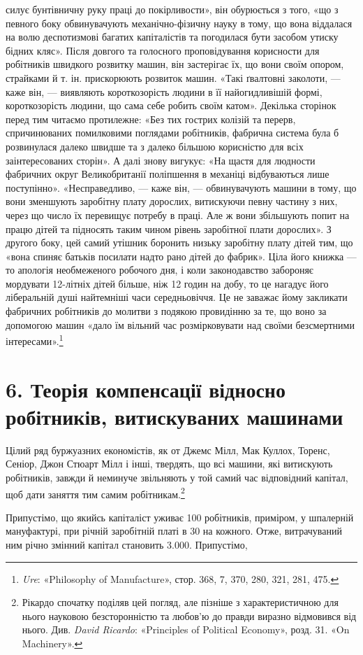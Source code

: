 \parcont{}  %
силує бунтівничну руку праці до покірливости», він обурюється
з того, «що з певного боку обвинувачують механічно-фізичну
науку в тому, що вона віддалася на волю деспотизмові багатих
капіталістів та погодилася бути засобом утиску бідних кляс».
Після довгого та голосного проповідування корисности для робітників
швидкого розвитку машин, він застерігає їх, що вони своїм
опором, страйками й т. ін. прискорюють розвиток машин. «Такі
ґвалтовні заколоти, — каже він, — виявляють короткозорість людини
в її найогидливішій формі, короткозорість людини, що сама
себе робить своїм катом». Декілька сторінок перед тим читаємо
протилежне: «Без тих гострих колізій та перерв, спричинюваних
помилковими поглядами робітників, фабрична система була б
розвинулася далеко швидше та з далеко більшою корисністю
для всіх заінтересованих сторін». А далі знову вигукує: «На
щастя для людности фабричних округ Великобританії поліпшення
в механіці відбуваються лише поступінно». «Несправедливо, —
каже він, — обвинувачують машини в тому, що вони зменшують
заробітну плату дорослих, витискуючи певну частину з них, через
що число їх перевищує потребу в праці. Але ж вони збільшують
попит на працю дітей та підносять таким чином рівень заробітної
плати дорослих». З другого боку, цей самий утішник боронить
низьку заробітну плату дітей тим, що «вона спиняє батьків посилати
надто рано дітей до фабрик». Ціла його книжка — то апологія
необмеженого робочого дня, і коли законодавство забороняє
мордувати 12-літніх дітей більше, ніж 12 годин на добу, то це
нагадує його ліберальній душі найтемніші часи середньовіччя.
Це не заважає йому закликати фабричних робітників до молитви
з подякою провидінню за те, що воно за допомогою машин
«дало їм вільний час розмірковувати над своїми безсмертними
інтересами».\footnote{
\emph{Ure}: «Philosophy of Manufacture», стор. 368, 7, 370, 280, 321, 281, 475.
}

\section*{6. Теорія компенсації відносно робітників, витискуваних
машинами}

Цілий ряд буржуазних економістів, як от Джемс Мілл, Мак
Куллох, Торенс, Сеніор, Джон Стюарт Мілл і інші, твердять,
що всі машини, які витискують робітників, завжди й неминуче
звільняють у той самий час відповідний капітал, щоб дати заняття
тим самим робітникам.\footnote{
Рікардо спочатку поділяв цей погляд, але пізніше з характеристичною
для нього науковою безсторонністю та любов’ю до правди виразно
відмовився від нього. Див. \emph{David Ricardo}: «Principles of Political
Economy», розд. 31. «On Machinery».
}

Припустімо, що якийсь капіталіст уживає 100 робітників,
приміром, у шпалерній мануфактурі, при річній заробітній платі
в 30 на кожного. Отже, витрачуваний ним річно
змінний капітал становить 3.000. Припустімо,
\parbreak{}  %
